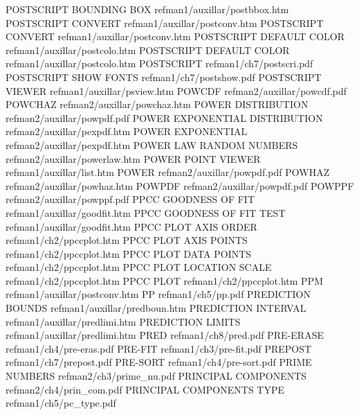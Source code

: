 POSTSCRIPT BOUNDING BOX                 refman1/auxillar/postbbox.htm
POSTSCRIPT CONVERT                      refman1/auxillar/postconv.htm
POSTSCRIPT CONVERT                      refman1/auxillar/postconv.htm
POSTSCRIPT DEFAULT COLOR                refman1/auxillar/postcolo.htm
POSTSCRIPT DEFAULT COLOR                refman1/auxillar/postcolo.htm
POSTSCRIPT                              refman1/ch7/postscri.pdf
POSTSCRIPT SHOW FONTS                   refman1/ch7/postshow.pdf
POSTSCRIPT VIEWER                       refman1/auxillar/psview.htm
POWCDF                                  refman2/auxillar/powcdf.pdf
POWCHAZ                                 refman2/auxillar/powchaz.htm
POWER DISTRIBUTION                      refman2/auxillar/powpdf.pdf
POWER EXPONENTIAL DISTRIBUTION          refman2/auxillar/pexpdf.htm
POWER EXPONENTIAL                       refman2/auxillar/pexpdf.htm
POWER LAW RANDOM NUMBERS                refman2/auxillar/powerlaw.htm
POWER POINT VIEWER                      refman1/auxillar/list.htm
POWER                                   refman2/auxillar/powpdf.pdf
POWHAZ                                  refman2/auxillar/powhaz.htm
POWPDF                                  refman2/auxillar/powpdf.pdf
POWPPF                                  refman2/auxillar/powppf.pdf
PPCC GOODNESS OF FIT                    refman1/auxillar/goodfit.htm
PPCC GOODNESS OF FIT TEST               refman1/auxillar/goodfit.htm
PPCC PLOT AXIS ORDER                    refman1/ch2/ppccplot.htm
PPCC PLOT AXIS POINTS                   refman1/ch2/ppccplot.htm
PPCC PLOT DATA POINTS                   refman1/ch2/ppccplot.htm
PPCC PLOT LOCATION SCALE                refman1/ch2/ppccplot.htm
PPCC PLOT                               refman1/ch2/ppccplot.htm
PPM                                     refman1/auxillar/postconv.htm
PP                                      refman1/ch5/pp.pdf
PREDICTION BOUNDS                       refman1/auxillar/predboun.htm
PREDICTION INTERVAL                     refman1/auxillar/predlimi.htm
PREDICTION LIMITS                       refman1/auxillar/predlimi.htm
PRED                                    refman1/ch8/pred.pdf
PRE-ERASE                               refman1/ch4/pre-eras.pdf
PRE-FIT                                 refman1/ch3/pre-fit.pdf
PREPOST                                 refman1/ch7/prepost.pdf
PRE-SORT                                refman1/ch4/pre-sort.pdf
PRIME NUMBERS                           refman2/ch3/prime_nu.pdf
PRINCIPAL COMPONENTS                    refman2/ch4/prin_com.pdf
PRINCIPAL COMPONENTS TYPE               refman1/ch5/pc_type.pdf
